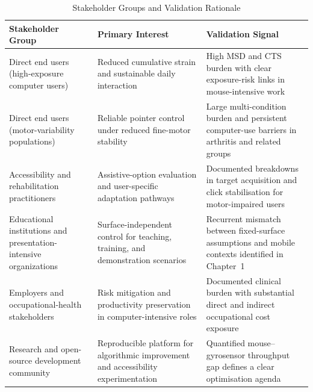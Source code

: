 \label{appendix:stakeholder_table}

\begin{table}[!htb]
\caption{Stakeholder Groups and Validation Rationale}
\label{tbl:stakeholders_appendix}
\centering
\begin{tabularx}{\textwidth}{|Y|Y|Y|}
\hline
\textbf{Stakeholder Group} & \textbf{Primary Interest} & \textbf{Validation Signal} \\
\hline
Direct end users (high-exposure computer users) & Reduced cumulative strain and sustainable daily interaction & High MSD and CTS burden with clear exposure-risk links in mouse-intensive work~\cite{demissie2024wrmsd,dale2013cts} \\
\hline
Direct end users (motor-variability populations) & Reliable pointer control under reduced fine-motor stability & Large multi-condition burden and persistent computer-use barriers in arthritis and related groups~\cite{who2022disability,gbd2023oa,baker2009arthritis} \\
\hline
Accessibility and rehabilitation practitioners & Assistive-option evaluation and user-specific adaptation pathways & Documented breakdowns in target acquisition and click stabilisation for motor-impaired users~\cite{wobbrock2008goal} \\
\hline
Educational institutions and presentation-intensive organizations & Surface-independent control for teaching, training, and demonstration scenarios & Recurrent mismatch between fixed-surface assumptions and mobile contexts identified in Chapter~1 \\
\hline
Employers and occupational-health stakeholders & Risk mitigation and productivity preservation in computer-intensive roles & Documented clinical burden with substantial direct and indirect occupational cost exposure~\cite{demissie2024wrmsd,nrc2001msd} \\
\hline
Research and open-source development community & Reproducible platform for algorithmic improvement and accessibility experimentation & Quantified mouse--gyrosensor throughput gap defines a clear optimisation agenda~\cite{ramcharitar2017fitts} \\
\hline
\end{tabularx}
\end{table}